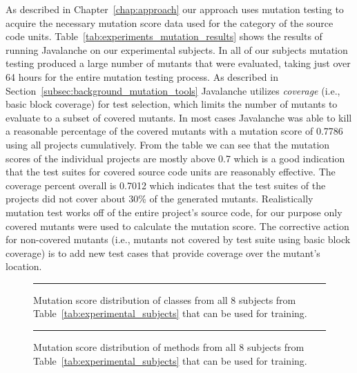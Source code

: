 As described in Chapter~\ref{chap:approach} our approach uses mutation testing to acquire the necessary mutation score data used for the category of the source code units. Table~\ref{tab:experiments_mutation_results} shows the results of running Javalanche on our experimental subjects. In all of our subjects mutation testing produced a large number of mutants that were evaluated, taking just over 64 hours for the entire mutation testing process. As described in Section~\ref{subsec:background_mutation_tools} Javalanche utilizes \emph{coverage} (i.e., basic block coverage) for test selection, which limits the number of mutants to evaluate to a subset of covered mutants. In most cases Javalanche was able to kill a reasonable percentage of the covered mutants with a mutation score of 0.7786 using all projects cumulatively. From the table we can see that the mutation scores of the individual projects are mostly above 0.7 which is a good indication that the test suites for covered source code units are reasonably effective. The coverage percent overall is 0.7012 which indicates that the test suites of the projects did not cover about 30\% of the generated mutants. Realistically mutation test works off of the entire project's source code, for our purpose only covered mutants were used to calculate the mutation score. The corrective action for non-covered mutants (i.e., mutants not covered by test suite using basic block coverage) is to add new test cases that provide coverage over the mutant's location.

\begin{figure}[ht!]
  \centering
  \caption{Mutation score distribution of classes from all 8 subjects from Table~\ref{tab:experimental_subjects} that can be used for training.}
  \vspace{2mm}
  \hrule
  \label{fig:mutation_distributions_class_all}
\end{figure}

\begin{figure}[ht!]
  \centering
  \caption{Mutation score distribution of methods from all 8 subjects from Table~\ref{tab:experimental_subjects} that can be used for training.}
  \vspace{2mm}
  \hrule
  \label{fig:mutation_distributions_method_all}
\end{figure}

